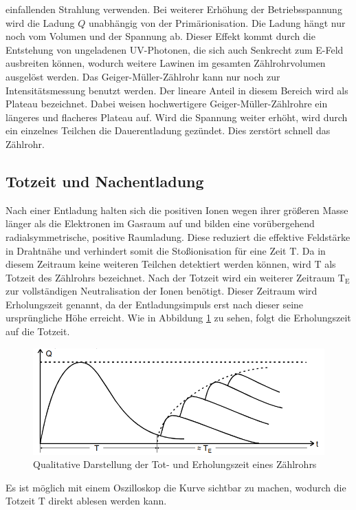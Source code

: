 einfallenden Strahlung verwenden.
Bei weiterer Erhöhung der Betriebsspannung wird die Ladung $Q$ unabhängig von der Primärionisation. 
Die Ladung hängt nur noch vom Volumen und der Spannung ab. Dieser Effekt kommt durch die Entstehung von ungeladenen UV-Photonen, die sich auch Senkrecht zum E-Feld
ausbreiten können, wodurch weitere Lawinen im gesamten Zählrohrvolumen ausgelöst werden. 
Das Geiger-Müller-Zählrohr kann nur noch zur Intensitätsmessung benutzt werden.
Der lineare Anteil in diesem Bereich wird als Plateau bezeichnet. Dabei weisen hochwertigere Geiger-Müller-Zählrohre ein längeres und flacheres Plateau auf.
Wird die Spannung weiter erhöht, wird durch ein einzelnes Teilchen die Dauerentladung gezündet. Dies zerstört schnell das Zählrohr.
\subsection{Totzeit und Nachentladung}
Nach einer Entladung halten sich die positiven Ionen wegen ihrer größeren Masse länger als die Elektronen im Gasraum auf
und bilden eine vorübergehend radialsymmetrische, positive Raumladung.
Diese reduziert die effektive Feldstärke in Drahtnähe und verhindert somit die Stoßionisation für eine Zeit $\text{T}$.
Da in diesem Zeitraum keine weiteren Teilchen detektiert werden können, wird $\text{T}$ als Totzeit des Zählrohrs bezeichnet.
Nach der Totzeit wird ein weiterer Zeitraum $\text{T}_\text{E}$ zur vollständigen Neutralisation der Ionen benötigt.
Dieser Zeitraum wird Erholungszeit genannt, da der Entladungsimpuls erst nach dieser seine ursprüngliche Höhe erreicht.
Wie in Abbildung \ref{fig:tot} zu sehen, folgt die Erholungszeit auf die Totzeit.
\begin{figure}
  \centering
  \includegraphics[scale=0.6]{pics/totzeit.png}
  \caption{Qualitative Darstellung der Tot- und Erholungszeit eines Zählrohrs}
  \label{fig:tot}
\end{figure}
Es ist möglich mit einem Oszilloskop die Kurve sichtbar zu machen, wodurch die Totzeit $\text{T}$ direkt ablesen werden kann.
